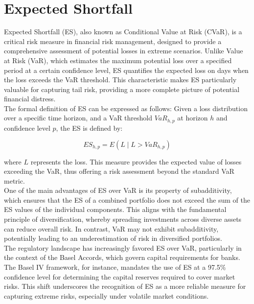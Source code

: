 \documentclass[a4paper,10pt]{article}
\begin{document}
\section{Expected Shortfall}

\noindent Expected Shortfall (ES), also known as Conditional Value at Risk (CVaR), is a critical risk measure in financial risk management, designed to provide a comprehensive assessment of potential losses in extreme scenarios. Unlike Value at Risk (VaR), which estimates the maximum potential loss over a specified period at a certain confidence level, ES quantifies the expected loss on days when the loss exceeds the VaR threshold. This characteristic makes ES particularly valuable for capturing tail risk, providing a more complete picture of potential financial distress.\\

\noindent The formal definition of ES can be expressed as follows: Given a loss distribution over a specific time horizon, and a VaR threshold \( VaR_{h,p} \) at horizon \( h \) and confidence level \( p \), the ES is defined by:

\[ ES_{h,p} = E(L \mid L > VaR_{h,p}) \]

\noindent where \( L \) represents the loss. This measure provides the expected value of losses exceeding the VaR, thus offering a risk assessment beyond the standard VaR metric.\\

\noindent One of the main advantages of ES over VaR is its property of subadditivity, which ensures that the ES of a combined portfolio does not exceed the sum of the ES values of the individual components. This aligns with the fundamental principle of diversification, whereby spreading investments across diverse assets can reduce overall risk. In contrast, VaR may not exhibit subadditivity, potentially leading to an underestimation of risk in diversified portfolios.\\

\noindent The regulatory landscape has increasingly favored ES over VaR, particularly in the context of the Basel Accords, which govern capital requirements for banks. The Basel IV framework, for instance, mandates the use of ES at a 97.5\% confidence level for determining the capital reserves required to cover market risks. This shift underscores the recognition of ES as a more reliable measure for capturing extreme risks, especially under volatile market conditions.\\
\end{document}

